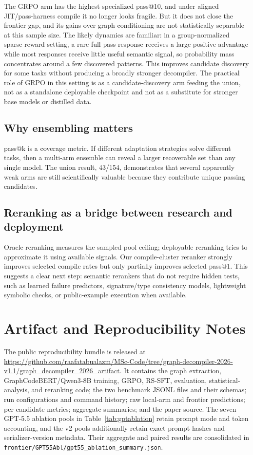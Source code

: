 \documentclass[11pt]{article}
\begin{document}
The GRPO arm has the highest specialized pass@10, and under aligned JIT/pass-harness compile it no longer looks fragile. But it does not close the frontier gap, and its gains over graph conditioning are not statistically separable at this sample size. The likely dynamics are familiar: in a group-normalized sparse-reward setting, a rare full-pass response receives a large positive advantage while most responses receive little useful semantic signal, so probability mass concentrates around a few discovered patterns. This improves candidate discovery for some tasks without producing a broadly stronger decompiler. The practical role of GRPO in this setting is as a candidate-discovery arm feeding the union, not as a standalone deployable checkpoint and not as a substitute for stronger base models or distilled data.

\subsection{Why ensembling matters}

pass@k is a coverage metric. If different adaptation strategies solve different tasks, then a multi-arm ensemble can reveal a larger recoverable set than any single model. The union result, 43/154, demonstrates that several apparently weak arms are still scientifically valuable because they contribute unique passing candidates.

\subsection{Reranking as a bridge between research and deployment}

Oracle reranking measures the sampled pool ceiling; deployable reranking tries to approximate it using available signals. Our compile-cluster reranker strongly improves selected compile rates but only partially improves selected pass@1. This suggests a clear next step: semantic rerankers that do not require hidden tests, such as learned failure predictors, signature/type consistency models, lightweight symbolic checks, or public-example execution when available.

\section{Artifact and Reproducibility Notes}

The public reproducibility bundle is released at \url{https://github.com/raafatabualazm/MSc-Code/tree/graph-decompiler-2026-v1.1/graph_decompiler_2026_artifact}. It contains the graph extraction, GraphCodeBERT/Qwen3-8B training, GRPO, RS-SFT, evaluation, statistical-analysis, and reranking code; the two benchmark JSONL files and their schemas; run configurations and command history; raw local-arm and frontier predictions; per-candidate metrics; aggregate summaries; and the paper source. The seven GPT-5.5 ablation pools in Table~\ref{tab:gptablation} retain prompt mode and token accounting, and the v2 pools additionally retain exact prompt hashes and serializer-version metadata. Their aggregate and paired results are consolidated in \texttt{frontier/GPT55Abl/gpt55\_ablation\_summary.json}.
\end{document}
